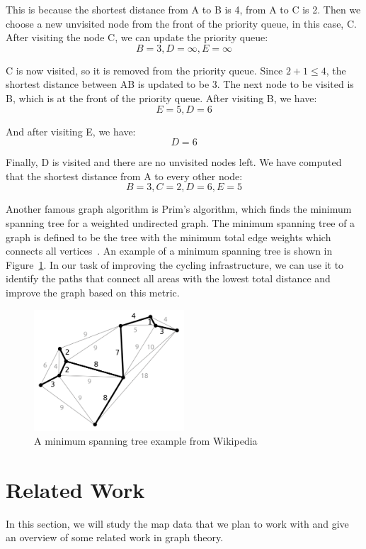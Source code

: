 \documentclass[12pt,a4paper]{report}
\begin{document}
This is because the shortest distance from A to B is 4, from A to C is 2. Then we choose a new unvisited node from the front of the priority queue, in this case, C. After visiting the node C, we can update the priority queue:
\[B=3, D=\infty, E=\infty\]

C is now visited, so it is removed from the priority queue. Since $2+1 \leq 4$, the shortest distance between AB is updated to be 3. The next node to be visited is B, which is at the front of the priority queue. After visiting B, we have:
\[E=5, D=6\]

And after visiting E, we have:
\[D=6\]

Finally, D is visited and there are no unvisited nodes left. We have computed that the shortest distance from A to every other node:
\[B=3, C=2, D=6, E=5\]

Another famous graph algorithm is Prim's algorithm, which finds the minimum spanning tree for a weighted undirected graph. The minimum spanning tree of a graph is defined to be the tree with the minimum total edge weights which connects all vertices~\cite{Pettie2008}. An example of a minimum spanning tree is shown in Figure~\ref{fig:mst_example}. In our task of improving the cycling infrastructure, we can use it to identify the paths that connect all areas with the lowest total distance and improve the graph based on this metric.

\begin{figure}[ht]
\centering
\includegraphics[width=0.5\textwidth]{diss_images/context/MST.png}
\caption{A minimum spanning tree example from Wikipedia~\cite{WikipediaEN:MST}}
\label{fig:mst_example}
\end{figure}

\section{Related Work}\label{sec:related_work}
In this section, we will study the map data that we plan to work with and give an overview of some related work in graph theory.
\end{document}
